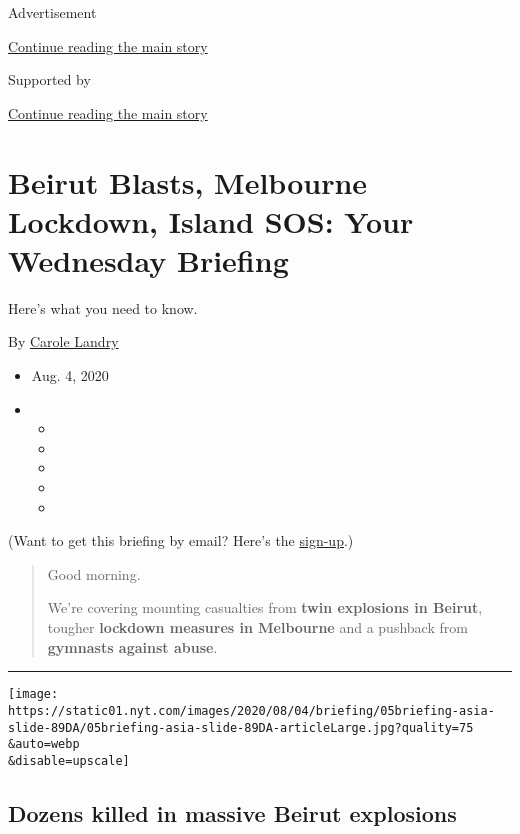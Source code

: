 Advertisement

\protect\hyperlink{after-top}{Continue reading the main story}

Supported by

\protect\hyperlink{after-sponsor}{Continue reading the main story}

\hypertarget{beirut-blasts-melbourne-lockdown-island-sos-your-wednesday-briefing}{%
\section{Beirut Blasts, Melbourne Lockdown, Island SOS: Your Wednesday
Briefing}\label{beirut-blasts-melbourne-lockdown-island-sos-your-wednesday-briefing}}

Here's what you need to know.

By \href{https://www.nytimes.com/by/carole-landry}{Carole Landry}

\begin{itemize}
\item
  Aug. 4, 2020
\item
  \begin{itemize}
  \item
  \item
  \item
  \item
  \item
  \end{itemize}
\end{itemize}

(Want to get this briefing by email? Here's the
\href{https://www.nytimes.com/morning-briefing}{sign-up}.)

\begin{quote}
Good morning.

We're covering mounting casualties from \textbf{twin explosions in
Beirut}, tougher \textbf{lockdown measures in Melbourne} and a pushback
from \textbf{gymnasts against abuse}.
\end{quote}

\begin{center}\rule{0.5\linewidth}{\linethickness}\end{center}

\texttt{[image: https://static01.nyt.com/images/2020/08/04/briefing/05briefing-asia-slide-89DA/05briefing-asia-slide-89DA-articleLarge.jpg?quality=75\\\&auto=webp\\\&disable=upscale]}

\hypertarget{dozens-killed-in-massive-beirut-explosions}{%
\subsection{Dozens killed in massive Beirut
explosions}\label{dozens-killed-in-massive-beirut-explosions}}


